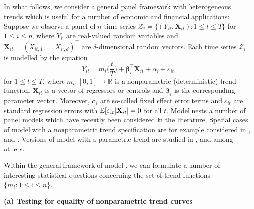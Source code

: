\documentclass[a4paper,12pt]{article}
\makeatletter
\renewcommand{\eqref}[1]{\tagform@{\ref{#1}}}
\makeatother
\begin{document}
 
In what follows, we consider a general panel framework with heterogeneous trends which is useful for a number of economic and financial applications: Suppose we observe a panel of $n$ time series $\mathcal{Z}_i = \{ (Y_{it},\mathbf{X}_{it}): 1 \le t \le T \}$ for $1 \le i \le n$, where $Y_{it}$ are real-valued random variables and $\mathbf{X}_{it} = (X_{it,1},\ldots,X_{it,d})^\top$ are $d$-dimensional random vectors. Each time series $\mathcal{Z}_i$ is modelled by the equation
\begin{equation}\label{model}
Y_{it} = m_i \Big( \frac{t}{T} \Big) + \bm{\beta}_i^\top \mathbf{X}_{it} + \alpha_i + \varepsilon_{it}
\end{equation}
for $1 \le t \le T$, where $m_i: [0,1] \rightarrow \mathbb{R}$ is a nonparametric (deterministic) trend function, $\mathbf{X}_{it}$ is a vector of regressors or controls and $\bm{\beta}_i$ is the corresponding parameter vector. Moreover, $\alpha_i$ are so-called fixed effect error terms and $\varepsilon_{it}$ are standard regression errors with $\mathbb{E}[\varepsilon_{it}|\mathbf{X}_{it}] = 0$ for all $t$. Model \eqref{model} nests a number of panel models which have recently been considered in the literature. Special cases of model \eqref{model} with a nonparametric trend specification are for example considered in \cite{Atak2011}, \cite{Zhang2012} and \cite{Hidalgo2014}. Versions of model \eqref{model} with a parametric trend are studied in \cite{Vogelsang2005}, \cite{Sun2011} and \cite{Xu2012} among others.

Within the general framework of model \eqref{model}, we can formulate a number of interesting statistical questions concerning the set of trend functions $\{ m_i:  1 \le i \le n \}$. 

\vspace{10pt}


\noindent \textbf{(a) Testing for equality of nonparametric trend curves} 
\vspace{10pt} 
\end{document}
